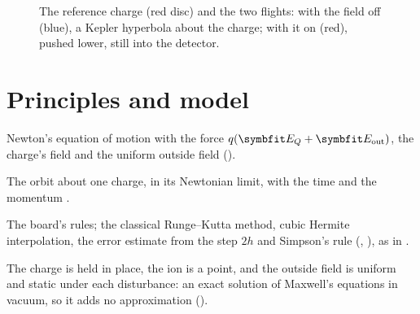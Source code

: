 \documentclass{leveldoc}
\begin{document}
\begin{figure}[htbp]
\centering
{}
\caption{The reference charge (red disc) and the two flights: with the field off (blue), a
Kepler hyperbola about the charge; with it on (red), pushed lower, still into the detector.}
\label{fig:board}
\end{figure}

\section{Principles and model}\label{sec:model}

\begin{principles}
  \item Newton's equation of motion with the force $q(\vect{E}_Q + \vect{E}_\mathrm{out})$, the
    charge's field  and the uniform outside field ().
  \item The orbit about one charge,  in its Newtonian limit, with
    the time  and the momentum .
  \item The board's rules; the classical Runge--Kutta method, cubic Hermite interpolation, the
    error estimate from the step $2h$ and Simpson's rule (,
    ), as in .
\end{principles}

The charge is held in place, the ion is a point, and the outside field is uniform and static
under each disturbance: an exact solution of Maxwell's equations in vacuum, so it adds no
approximation ().
\end{document}
